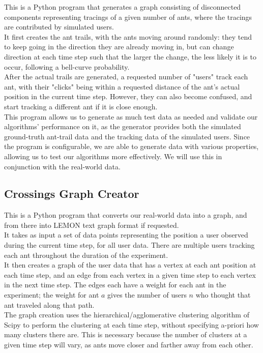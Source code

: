 \documentclass[12pt]{article}
\begin{document}
This is a Python program that generates a graph consisting of disconnected
components representing tracings of a given number of ants, where the tracings
are contributed by simulated users.\\
\indent It first creates the ant trails, with the ants moving around randomly: they tend
to keep going in the direction they are already moving in, but can change
direction at each time step such that the larger the change, the less likely it
is to occur, following a bell-curve probability.\\
\indent After the actual trails are generated, a requested number of "users" track each
ant, with their "clicks" being within a requested distance of the ant's actual
position in the current time step. However, they can also become confused, and
start tracking a different ant if it is close enough.\\
\indent This program allows us to generate as much test data as needed and validate our
algorithms' performance on it, as the generator provides both the simulated
ground-truth ant-trail data and the tracking data of the simulated users. Since
the program is configurable, we are able to generate data with various
properties, allowing us to test our algorithms more effectively. We will use
this in conjunction with the real-world data.


\subsection{Crossings Graph Creator}

This is a Python program that converts our real-world data into a graph, and
from there into LEMON \cite{LEMON} text graph format if requested.\\
\indent It takes as input a set of data points representing the position a user observed during the current time step, for all user data. There are multiple users tracking each ant throughout the duration of the experiment.\\
\indent It then creates a graph of the user data that has a vertex at each ant position
at each time step, and an edge from each vertex in a given time step to each
vertex in the next time step. The edges each have a weight for each ant in the
experiment; the weight for ant $a$ gives the number of users $n$ who thought
that ant traveled along that path.\\
\indent The graph creation uses the hierarchical/agglomerative clustering algorithm
of Scipy \cite{Scipy} to perform the clustering at each time step, without
specifying a-priori how many clusters there are. This is necessary because the
number of clusters at a given time step will vary, as ants move closer and
farther away from each other.
\end{document}
